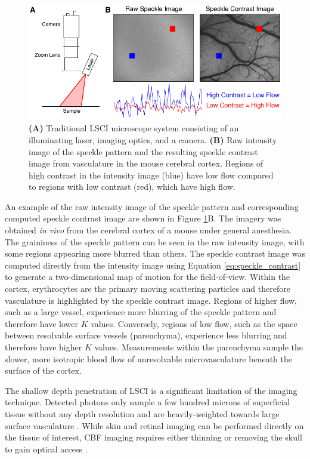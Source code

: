 \begin{figure}
    \includegraphics{figures/chapter_1/lsci_schematic.pdf}
    \caption {
        \label{fig:lsci_schematic}
        \textbf{(A)} Traditional LSCI microscope system consisting of an illuminating laser, imaging optics, and a camera. \textbf{(B)} Raw intensity image of the speckle pattern and the resulting speckle contrast image from vasculature in the mouse cerebral cortex. Regions of high contrast in the intensity image (blue) have low flow compared to regions with low contrast (red), which have high flow.
    }
\end{figure}

An example of the raw intensity image of the speckle pattern and corresponding computed speckle contrast image are shown in Figure \ref{fig:lsci_schematic}B. The imagery was obtained \textit{in vivo} from the cerebral cortex of a mouse under general anesthesia. The graininess of the speckle pattern can be seen in the raw intensity image, with some regions appearing more blurred than others. The speckle contrast image was computed directly from the intensity image using Equation \ref{eq:speckle_contrast} to generate a two-dimensional map of motion for the field-of-view. Within the cortex, erythrocytes are the primary moving scattering particles and therefore vasculature is highlighted by the speckle contrast image. Regions of higher flow, such as a large vessel, experience more blurring of the speckle pattern and therefore have lower $K$ values. Conversely, regions of low flow, such as the space between resolvable surface vessels (parenchyma), experience less blurring and therefore have higher $K$ values. Measurements within the parenchyma sample the slower, more isotropic blood flow of unresolvable microvasculature beneath the surface of the cortex.

The shallow depth penetration of LSCI is a significant limitation of the imaging technique. Detected photons only sample a few hundred microns of superficial tissue without any depth resolution and are heavily-weighted towards large surface vasculature \cite{Davis:2014kc}. While skin and retinal imaging can be performed directly on the tissue of interest, CBF imaging requires either thinning or removing the skull to gain optical access \cite{Boas:2010vr}.


